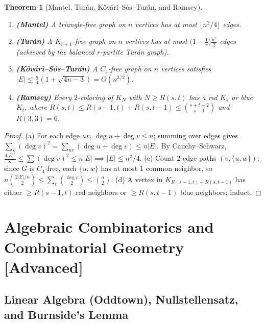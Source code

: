 \documentclass[11pt]{article}
\theoremstyle{plain}
\newtheorem{theorem}{Theorem}[section]
\theoremstyle{definition}
\begin{document}
\begin{theorem}[Mantel, Turán, Kővári--Sós--Turán, and Ramsey]
\leavevmode
\begin{enumerate}[label=(\alph*)]
\item \textbf{(Mantel)} A triangle-free graph on $n$ vertices has at most $\lfloor n^2/4 \rfloor$ edges.
\item \textbf{(Turán)} A $K_{r+1}$-free graph on $n$ vertices has at most $\bigl(1 - \frac1r\bigr)\frac{n^2}{2}$ edges (achieved by the balanced $r$-partite Turán graph).
\item \textbf{(Kővári--Sós--Turán)} A $C_4$-free graph on $n$ vertices satisfies $|E| \le \frac{n}{4}(1+\sqrt{4n-3}) = O(n^{3/2})$.
\item \textbf{(Ramsey)} Every $2$-coloring of $K_N$ with $N \ge R(s,t)$ has a red $K_s$ or blue $K_t$, where $R(s,t) \le R(s-1,t) + R(s,t-1) \le \binom{s+t-2}{s-1}$ and $R(3,3) = 6$.
\end{enumerate}
\end{theorem}
\begin{proof}
(a) For each edge $uv$, $\deg u + \deg v \le n$; summing over edges gives $\sum_{v} (\deg v)^2 = \sum_{uv}(\deg u + \deg v) \le n|E|$. By Cauchy--Schwarz, $\frac{4|E|^2}{n} \le \sum (\deg v)^2 \le n|E| \implies |E| \le n^2/4$.
(c) Count $2$-edge paths $(v, \{u,w\})$: since $G$ is $C_4$-free, each $\{u,w\}$ has at most $1$ common neighbor, so $n\binom{2|E|/n}{2} \le \sum_v \binom{\deg v}{2} \le \binom{n}{2}$.
(d) A vertex in $K_{R(s-1,t)+R(s,t-1)}$ has either $\ge R(s-1,t)$ red neighbors or $\ge R(s,t-1)$ blue neighbors; induct.
\end{proof}

\section{Algebraic Combinatorics and Combinatorial Geometry [Advanced]}

\subsection{Linear Algebra (Oddtown), Nullstellensatz, and Burnside's Lemma}
\end{document}
